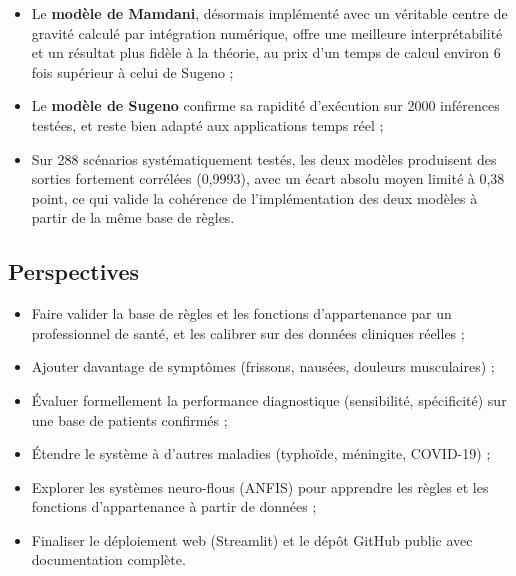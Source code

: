 \documentclass[a4paper,12pt]{report} %
\begin{document}
\begin{itemize}
\item Le \textbf{modèle de Mamdani}, désormais implémenté avec un véritable centre de gravité calculé par intégration numérique, offre une meilleure interprétabilité et un résultat plus fidèle à la théorie, au prix d'un temps de calcul environ 6 fois supérieur à celui de Sugeno ;
\item Le \textbf{modèle de Sugeno} confirme sa rapidité d'exécution sur 2000 inférences testées, et reste bien adapté aux applications temps réel ;
\item Sur 288 scénarios systématiquement testés, les deux modèles produisent des sorties fortement corrélées (0,9993), avec un écart absolu moyen limité à 0,38 point, ce qui valide la cohérence de l'implémentation des deux modèles à partir de la même base de règles.
\end{itemize}

\subsection*{Perspectives}

\begin{itemize}
\item Faire valider la base de règles et les fonctions d'appartenance par un professionnel de santé, et les calibrer sur des données cliniques réelles ;
\item Ajouter davantage de symptômes (frissons, nausées, douleurs musculaires) ;
\item Évaluer formellement la performance diagnostique (sensibilité, spécificité) sur une base de patients confirmés ;
\item Étendre le système à d'autres maladies (typhoïde, méningite, COVID-19) ;
\item Explorer les systèmes neuro-flous (ANFIS) pour apprendre les règles et les fonctions d'appartenance à partir de données ;
\item Finaliser le déploiement web (Streamlit) et le dépôt GitHub public avec documentation complète.
\end{itemize}

\end{document}
